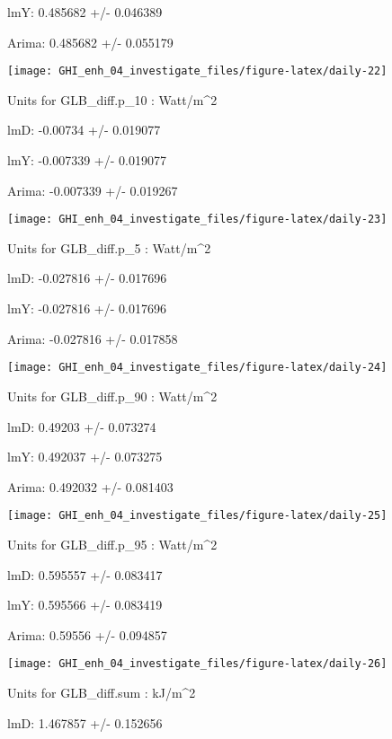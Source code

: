 \documentclass[
  10pt,
  a4paper,oneside]{article}
\begin{document}
lmY: 0.485682 +/- 0.046389

Arima: 0.485682 +/- 0.055179

\begin{center}\texttt{[image: GHI\_enh\_04\_investigate\_files/figure-latex/daily-22]} \end{center}

Units for GLB\_diff.p\_10 : Watt/m\^{}2

lmD: -0.00734 +/- 0.019077

lmY: -0.007339 +/- 0.019077

Arima: -0.007339 +/- 0.019267

\begin{center}\texttt{[image: GHI\_enh\_04\_investigate\_files/figure-latex/daily-23]} \end{center}

Units for GLB\_diff.p\_5 : Watt/m\^{}2

lmD: -0.027816 +/- 0.017696

lmY: -0.027816 +/- 0.017696

Arima: -0.027816 +/- 0.017858

\begin{center}\texttt{[image: GHI\_enh\_04\_investigate\_files/figure-latex/daily-24]} \end{center}

Units for GLB\_diff.p\_90 : Watt/m\^{}2

lmD: 0.49203 +/- 0.073274

lmY: 0.492037 +/- 0.073275

Arima: 0.492032 +/- 0.081403

\begin{center}\texttt{[image: GHI\_enh\_04\_investigate\_files/figure-latex/daily-25]} \end{center}

Units for GLB\_diff.p\_95 : Watt/m\^{}2

lmD: 0.595557 +/- 0.083417

lmY: 0.595566 +/- 0.083419

Arima: 0.59556 +/- 0.094857

\begin{center}\texttt{[image: GHI\_enh\_04\_investigate\_files/figure-latex/daily-26]} \end{center}

Units for GLB\_diff.sum : kJ/m\^{}2

lmD: 1.467857 +/- 0.152656
\end{document}

